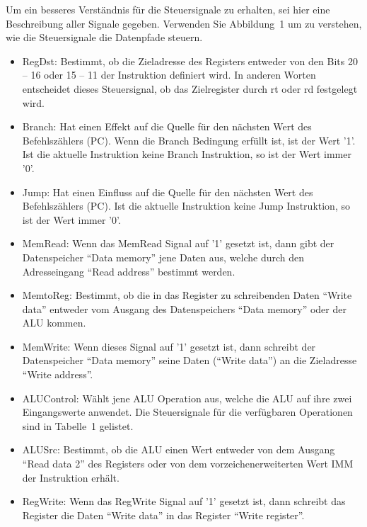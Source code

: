 \documentclass[a4paper,12pt]{article}
\begin{document}
Um ein besseres Verst\"andnis f\"ur die Steuersignale zu erhalten, sei hier eine Beschreibung aller Signale gegeben. Verwenden Sie Abbildung~1 um zu verstehen, wie die Steuersignale die Datenpfade steuern.
\begin{itemize}

	\item{RegDst: Bestimmt, ob die Zieladresse des Registers entweder von den Bits 20 -- 16 oder 15 -- 11 der Instruktion definiert wird. In anderen Worten entscheidet dieses Steuersignal, ob das Zielregister durch rt oder rd festgelegt wird.}

	\item{Branch: Hat einen Effekt auf die Quelle f\"ur den n\"achsten Wert des Befehlsz\"ahlers (PC). Wenn die Branch Bedingung erf\"ullt ist, ist der Wert '1'. Ist die aktuelle Instruktion keine Branch Instruktion, so ist der Wert immer '0'.}


	\item{Jump: Hat einen Einfluss auf die Quelle f\"ur den n\"achsten Wert des Befehlsz\"ahlers (PC). Ist die aktuelle Instruktion keine Jump Instruktion, so ist der Wert immer '0'.}

	\item{MemRead: Wenn das MemRead Signal auf '1' gesetzt ist, dann gibt der Datenspeicher "`Data memory"' jene Daten aus, welche durch den Adresseingang "`Read address"' bestimmt werden.}

	\item{MemtoReg: Bestimmt, ob die in das Register zu schreibenden Daten "`Write data"' entweder vom Ausgang des Datenspeichers "`Data memory"' oder der ALU kommen.}

	\item{MemWrite: Wenn dieses Signal auf '1' gesetzt ist, dann schreibt der Datenspeicher "`Data memory"' seine Daten ("`Write data"') an die Zieladresse "`Write address"'.}

	\item{ALUControl: W\"ahlt jene ALU Operation aus, welche die ALU auf ihre zwei Eingangswerte anwendet. Die Steuersignale f\"ur die verf\"ugbaren Operationen sind in Tabelle~1 gelistet.}

	\item{ALUSrc: Bestimmt, ob die ALU einen Wert entweder von dem Ausgang "`Read data 2"' des Registers oder von dem vorzeichenerweiterten Wert IMM der Instruktion erh\"alt.}

	\item{RegWrite: Wenn das RegWrite Signal auf '1' gesetzt ist, dann schreibt das Register die Daten "`Write data"' in das Register "`Write register"'.\\}

\end{itemize}
\end{document}
